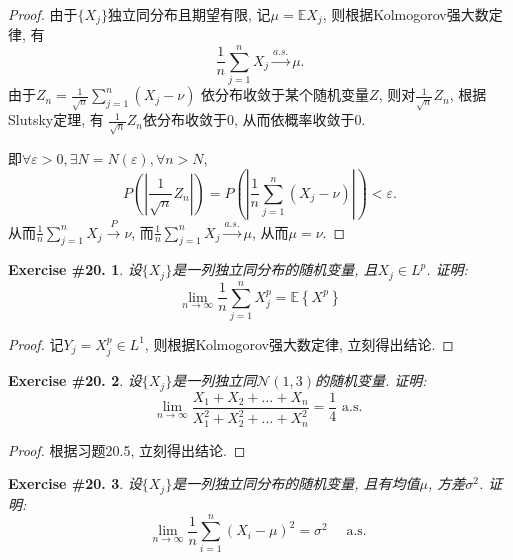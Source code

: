 \documentclass[UTF8, a4paper]{article}
\newtheorem{exercise}{Exercise \#20.}
\begin{document}
\begin{proof}
由于\(\{X_j\}\)独立同分布且期望有限, 记\(\mu = \mathbb{E}X_j\), 则根据Kolmogorov强大数定律, 有
$$
\frac{1}{n}\sum_{j=1}^{n}X_j \xrightarrow{a.s.} \mu.
$$
由于\(Z_n = \frac{1}{\sqrt{n}} \sum_{j = 1}^{n}(X_j - \nu)\)
依分布收敛于某个随机变量\(Z\), 则对\(\frac{1}{\sqrt{n}}Z_n\), 
根据Slutsky定理, 有 \(\frac{1}{\sqrt{n}}Z_n\)依分布收敛于\(0\), 从而依概率收敛于\(0\).

即\(\forall \varepsilon > 0, \exists N = N(\varepsilon), \forall n > N\), 
$$
P\left(\left|\frac{1}{\sqrt{n}}Z_n\right|\right) = P\left(\left|\frac{1}{n}\sum_{j = 1}^{n}(X_j - \nu)\right|\right)  < \varepsilon.
$$
从而\(\frac{1}{n}\sum_{j=1}^{n}X_j \xrightarrow{P} \nu\), 而\(\frac{1}{n}\sum_{j=1}^{n}X_j \xrightarrow{a.s.} \mu\), 从而\(\mu = \nu\).
\end{proof}

\begin{framed}
\begin{exercise}
设\(\{X_j\}\)是一列独立同分布的随机变量, 且\(X_j \in L^p\).
证明: 
$$
\lim _{n \rightarrow \infty} \frac{1}{n} \sum_{j=1}^n X_j^p=\mathbb{E}\left\{X^p\right\}
$$
\end{exercise}
\end{framed}

\begin{proof}
记\(Y_j = X_j^p \in L^1\), 则根据Kolmogorov强大数定律, 立刻得出结论.
\end{proof}

\begin{framed}
\begin{exercise}
设\(\{X_j\}\)是一列独立同\(\mathcal{N}(1,3)\)的随机变量. 证明:
$$
\lim _{n \rightarrow \infty} \frac{X_1+X_2+\ldots+X_n}{X_1^2+X_2^2+\ldots+X_n^2}=\frac{1}{4} \text { a.s. }
$$
\end{exercise}
\end{framed}

\begin{proof}
根据习题20.5, 立刻得出结论.
\end{proof}


\begin{framed}
\begin{exercise}
设\(\{X_j\}\)是一列独立同分布的随机变量, 且有均值\(\mu\), 方差\(\sigma^2\).
证明:
$$
\lim _{n \rightarrow \infty} \frac{1}{n} \sum_{i=1}^n\left(X_i-\mu\right)^2=\sigma^2 \quad \text { a.s. }
$$
\end{exercise}
\end{framed}
\end{document}
